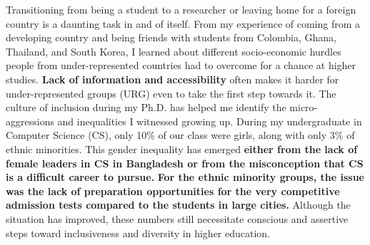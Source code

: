 \documentclass[9pt]{article}
\begin{document}
 Transitioning from being a student to a researcher or leaving home for a foreign country is a daunting task in and of itself.
From my experience of coming from a developing country
and being friends with students from Colombia, Ghana, Thailand, and South Korea, I learned about different socio-economic hurdles people from under-represented countries had to overcome for a chance at higher studies. \textbf{Lack of information and accessibility} often makes it harder for under-represented groups (URG) even to take the first step towards it.
%
%
The culture of inclusion during my Ph.D. has helped me identify the micro-aggressions and inequalities I witnessed growing up.
%
During my undergraduate in Computer Science (CS), only 10\% of our class were girls, %
along with only 3\% of ethnic minorities. 
This gender inequality has emerged \textbf{either from the lack of female leaders in CS in Bangladesh or from the misconception that CS is a difficult career to pursue.} 
\textbf{For the ethnic minority groups, the issue was the lack of preparation opportunities for the very competitive admission tests compared to the students in large cities.}
Although the situation has improved, these numbers still necessitate conscious and assertive steps toward inclusiveness and diversity in higher education. 

\end{document}
